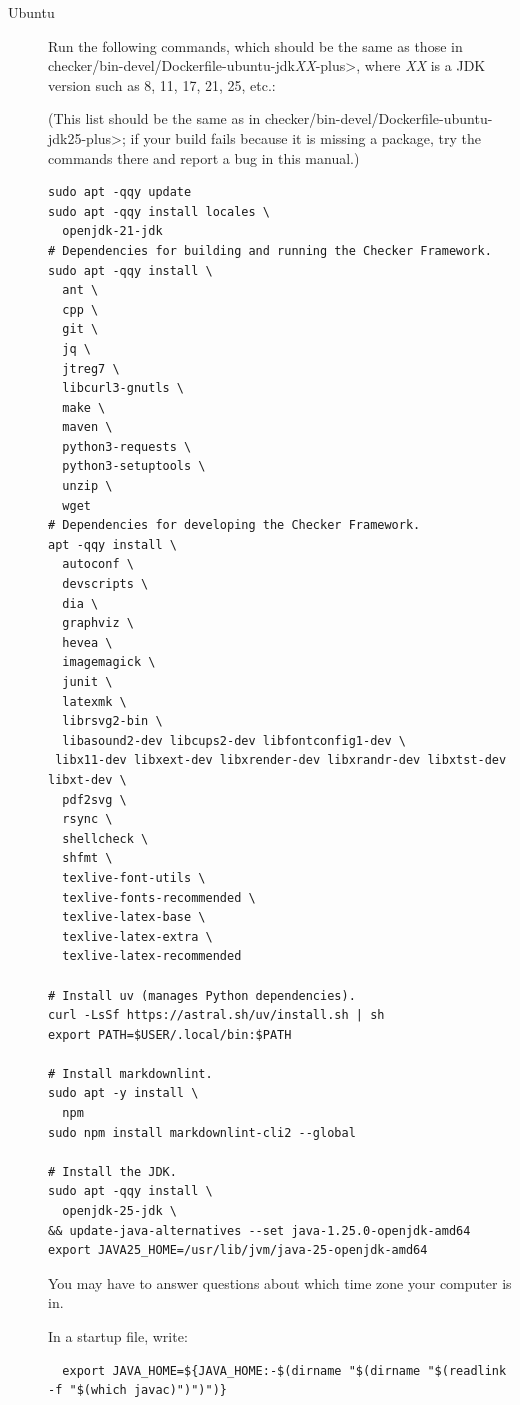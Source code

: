 \begin{description}
\item[Ubuntu]
  Run the following commands, which should be the same as those in
  \<checker/bin-devel/Dockerfile-ubuntu-jdk\emph{XX}-plus>, where \emph{XX}
  is a JDK version such as 8, 11, 17, 21, 25, etc.:

(This list should be the same as in
\<checker/bin-devel/Dockerfile-ubuntu-jdk25-plus>; if your build fails
because it is missing a package, try the commands there and report a bug
in this manual.)


\begin{Verbatim}
sudo apt -qqy update
sudo apt -qqy install locales \
  openjdk-21-jdk
# Dependencies for building and running the Checker Framework.
sudo apt -qqy install \
  ant \
  cpp \
  git \
  jq \
  jtreg7 \
  libcurl3-gnutls \
  make \
  maven \
  python3-requests \
  python3-setuptools \
  unzip \
  wget
# Dependencies for developing the Checker Framework.
apt -qqy install \
  autoconf \
  devscripts \
  dia \
  graphviz \
  hevea \
  imagemagick \
  junit \
  latexmk \
  librsvg2-bin \
  libasound2-dev libcups2-dev libfontconfig1-dev \
 libx11-dev libxext-dev libxrender-dev libxrandr-dev libxtst-dev libxt-dev \
  pdf2svg \
  rsync \
  shellcheck \
  shfmt \
  texlive-font-utils \
  texlive-fonts-recommended \
  texlive-latex-base \
  texlive-latex-extra \
  texlive-latex-recommended

# Install uv (manages Python dependencies).
curl -LsSf https://astral.sh/uv/install.sh | sh
export PATH=$USER/.local/bin:$PATH

# Install markdownlint.
sudo apt -y install \
  npm
sudo npm install markdownlint-cli2 --global

# Install the JDK.
sudo apt -qqy install \
  openjdk-25-jdk \
&& update-java-alternatives --set java-1.25.0-openjdk-amd64
export JAVA25_HOME=/usr/lib/jvm/java-25-openjdk-amd64
\end{Verbatim}


  You may have to answer questions about which time zone your computer is in.

In a startup file, write:
\begin{smaller}
\begin{Verbatim}
  export JAVA_HOME=${JAVA_HOME:-$(dirname "$(dirname "$(readlink -f "$(which javac)")")")}
\end{Verbatim}
\end{smaller}


\end{description}
